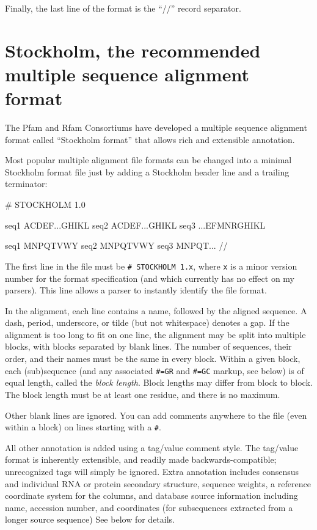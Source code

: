 Finally, the last line of the format is the ``//'' record separator.

\section{Stockholm, the recommended multiple sequence alignment format}
\label{section:stockholm}

The Pfam and Rfam Consortiums have developed a multiple sequence
alignment format called ``Stockholm format'' that allows rich and
extensible annotation. 

Most popular multiple alignment file formats can be changed into a
minimal Stockholm format file just by adding a Stockholm header line
and a trailing \mono{//} terminator:

\begin{sreoutput}
# STOCKHOLM 1.0

seq1  ACDEF...GHIKL
seq2  ACDEF...GHIKL
seq3  ...EFMNRGHIKL

seq1  MNPQTVWY
seq2  MNPQTVWY
seq3  MNPQT...
//
\end{sreoutput}

The first line in the file must be \verb+# STOCKHOLM 1.x+, where
\verb+x+ is a minor version number for the format specification
(and which currently has no effect on my parsers). This line allows a
parser to instantly identify the file format.

In the alignment, each line contains a name, followed by the aligned
sequence. A dash, period, underscore, or tilde (but not whitespace)
denotes a gap. If the alignment is too long to fit on one line, the
alignment may be split into multiple blocks, with blocks separated by
blank lines. The number of sequences, their order, and their names
must be the same in every block. Within a given block, each
(sub)sequence (and any associated \verb+#=GR+ and \verb+#=GC+ markup,
see below) is of equal length, called the \textit{block length}. Block
lengths may differ from block to block. The block length must be at
least one residue, and there is no maximum.

Other blank lines are ignored. You can add comments anywhere to the
file (even within a block) on lines starting with a \verb+#+.

All other annotation is added using a tag/value comment style. The
tag/value format is inherently extensible, and readily made
backwards-compatible; unrecognized tags will simply be ignored. Extra
annotation includes consensus and individual RNA or protein secondary
structure, sequence weights, a reference coordinate system for the
columns, and database source information including name, accession
number, and coordinates (for subsequences extracted from a longer
source sequence) See below for details.


